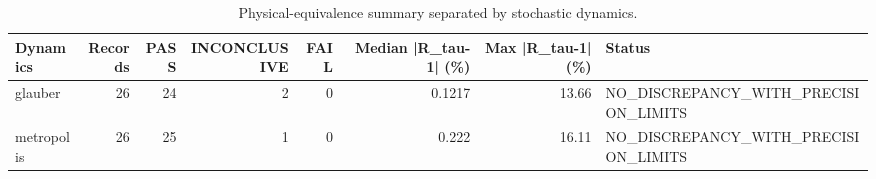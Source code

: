 \begin{table}
\caption{Physical-equivalence summary separated by stochastic dynamics.}
\label{tab:physical_validation_dynamics}
\begin{tabular}{lrrrrrrl}
\toprule
Dynamics & Records & PASS & INCONCLUSIVE & FAIL & Median |R\_tau-1| (\%) & Max |R\_tau-1| (\%) & Status \\
\midrule
glauber & 26 & 24 & 2 & 0 & 0.1217 & 13.66 & NO\_DISCREPANCY\_WITH\_PRECISION\_LIMITS \\
metropolis & 26 & 25 & 1 & 0 & 0.222 & 16.11 & NO\_DISCREPANCY\_WITH\_PRECISION\_LIMITS \\
\bottomrule
\end{tabular}
\end{table}
